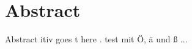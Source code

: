 

\chapter*{Abstract}

Abstract \gls{itiv} goes \gls{t} here \cite{einstein}. test mit Ö, ä und ß ...